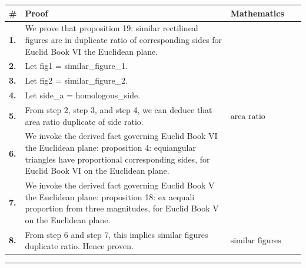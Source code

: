 \documentclass[11pt]{article}
\theoremstyle{definition}
\begin{document}
\begin{tabular}{@{} >{\raggedright\arraybackslash}p{} >{\raggedright\arraybackslash}p{} >{\raggedleft\arraybackslash}p{} @{}}
\textbf{\#} & \textbf{Proof} & \textbf{Mathematics} \\
\midrule
\textbf{1.} & We prove that proposition 19: similar rectilineal figures are in duplicate ratio of corresponding sides for Euclid Book VI the Euclidean plane. & \\[0.45em]
\textbf{2.} & Let fig1 = similar\_figure\_1. & \\[0.45em]
\textbf{3.} & Let fig2 = similar\_figure\_2. & \\[0.45em]
\textbf{4.} & Let side\_a = homologous\_side. & \\[0.45em]
\textbf{5.} & From step 2, step 3, and step 4, we can deduce that area ratio duplicate of side ratio. & $\displaystyle \text{area ratio duplicate of side ratio}$ \\[0.45em]
\textbf{6.} & We invoke the derived fact governing Euclid Book VI the Euclidean plane: proposition 4: equiangular triangles have proportional corresponding sides, for Euclid Book VI on the Euclidean plane. & \\[0.45em]
\textbf{7.} & We invoke the derived fact governing Euclid Book V the Euclidean plane: proposition 18: ex aequali proportion from three magnitudes, for Euclid Book V on the Euclidean plane. & \\[0.45em]
\textbf{8.} & From step 6 and step 7, this implies similar figures duplicate ratio. Hence proven. & $\displaystyle \text{similar figures duplicate ratio}$ \\[0.45em]
\bottomrule
\end{tabular}
\label{thm:Geometry-Euclid Book VI-proposition_19_similar_rectilineal_figures_are_in_duplicate_ratio_of_corresponding_sides}
\par\medskip\hrule
\end{document}
